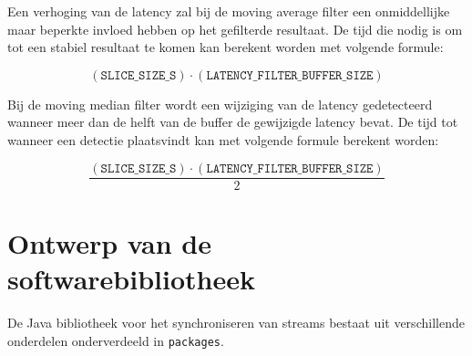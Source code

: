 Een verhoging van de latency zal bij de moving average filter een onmiddellijke maar beperkte invloed hebben op het gefilterde resultaat. De tijd die nodig is om tot een stabiel resultaat te komen kan berekent worden met volgende formule:

\begin{equation}
	(\texttt{SLICE\_SIZE\_S}) \cdot (\texttt{LATENCY\_FILTER\_BUFFER\_SIZE})
\end{equation}

Bij de moving median filter wordt een wijziging van de latency gedetecteerd wanneer meer dan de helft van de buffer de gewijzigde latency bevat. De tijd tot wanneer een detectie plaatsvindt kan met volgende formule berekent worden:

\begin{equation}
\frac{(\texttt{SLICE\_SIZE\_S}) \cdot (\texttt{LATENCY\_FILTER\_BUFFER\_SIZE})}{2}
\end{equation}

\section{Ontwerp van de softwarebibliotheek}
\label{ontwerp}

De Java bibliotheek voor het synchroniseren van streams bestaat uit verschillende onderdelen onderverdeeld in \texttt{packages}.


